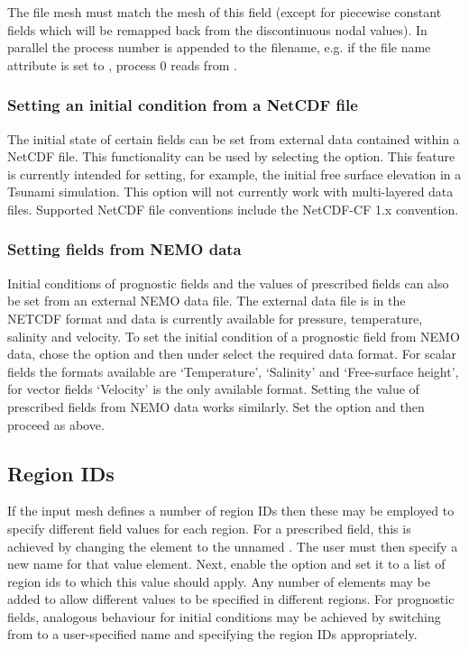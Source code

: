 The file mesh must match the mesh of this field (except for piecewise constant
fields which will be remapped back from the discontinuous nodal values). In
parallel the process number is appended to the filename, e.g. if the file name
attribute is set to , process 0 reads from .

\subsubsection{Setting an initial condition from a NetCDF file}\label{sec:setting_from_netcdf}

The initial state of certain fields can be set from external data contained within a NetCDF file.
This functionality can be used by selecting the 
option. This feature is currently intended for setting, for example, the initial free surface elevation
in a Tsunami simulation. This option will not currently work with multi-layered data files. Supported
NetCDF file conventions include the NetCDF-CF 1.x convention.

\subsubsection{Setting fields from NEMO data}\label{sec:setting_from_nemo}
Initial conditions of prognostic fields and the values of prescribed fields can also be set from an external NEMO
data file. The external data file is in the NETCDF format and data is currently available for pressure, temperature, salinity
and velocity. To set the initial condition of a prognostic field from NEMO data, chose the option 
 and then under  select the required data format. For scalar fields
the formats available are `Temperature', `Salinity' and `Free-surface height', for vector fields `Velocity' is the only available format.
Setting the value of prescribed fields from NEMO data works similarly. Set the option  and then proceed as above.

\subsection{Region IDs}
If the input mesh defines a number of region IDs then these may be employed
to specify different field values for each region. For a prescribed field,
this is achieved by changing the  element to
the unnamed . The user must then specify a new name for
that value element. Next, enable the  
option and set it to a list of region ids to which this value should
apply. Any number of   elements may be added to allow
different values to be specified in different regions. For prognostic
fields, analogous behaviour for initial conditions may be achieved by
switching  from  to a
user-specified name and specifying the region IDs appropriately.

